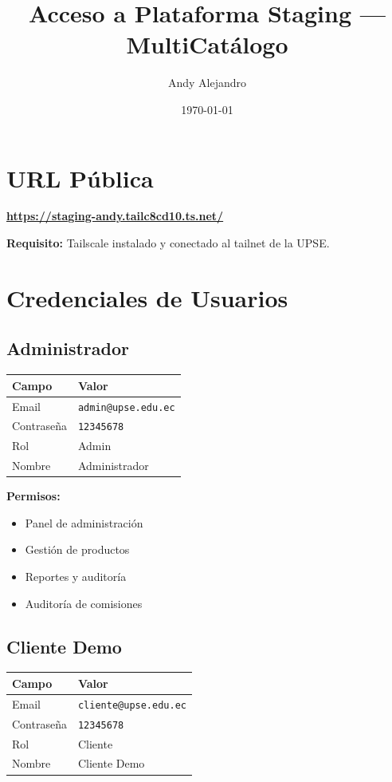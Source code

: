 \documentclass[11pt]{article}
\title{Acceso a Plataforma Staging --- MultiCatálogo}
\author{Andy Alejandro}
\date{\today}
\begin{document}
\maketitle

\section{URL Pública}

\begin{center}
\Large\textbf{\textcolor{blue}{\url{https://staging-andy.tailc8cd10.ts.net/}}}
\end{center}

\textbf{Requisito:} Tailscale instalado y conectado al tailnet de la UPSE.

\section{Credenciales de Usuarios}

\subsection{Administrador}

\begin{table}[h]
\centering
\begin{tabular}{|l|l|}
\hline
\textbf{Campo} & \textbf{Valor} \\
\hline
Email & \texttt{admin@upse.edu.ec} \\
\hline
Contraseña & \texttt{12345678} \\
\hline
Rol & Admin \\
\hline
Nombre & Administrador \\
\hline
\end{tabular}
\end{table}

\textbf{Permisos:}
\begin{itemize}
\item Panel de administración
\item Gestión de productos
\item Reportes y auditoría
\item Auditoría de comisiones
\end{itemize}

\subsection{Cliente Demo}

\begin{table}[h]
\centering
\begin{tabular}{|l|l|}
\hline
\textbf{Campo} & \textbf{Valor} \\
\hline
Email & \texttt{cliente@upse.edu.ec} \\
\hline
Contraseña & \texttt{12345678} \\
\hline
Rol & Cliente \\
\hline
Nombre & Cliente Demo \\
\hline
\end{tabular}
\end{table}
\end{document}
